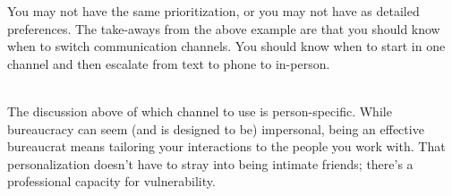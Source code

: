 You may not have the same prioritization, or you may not have as detailed preferences. The take-aways from the above example are that you should know when to switch communication channels.
%
%
You should know when to start in one channel and then escalate from text to phone to in-person.

\ \\


The discussion above of which channel to use is person-specific. While bureaucracy can seem (and is designed to be) impersonal, being an effective bureaucrat means tailoring your interactions to the people you work with. That personalization doesn't have to stray into being intimate friends; there's a professional capacity for vulnerability. 